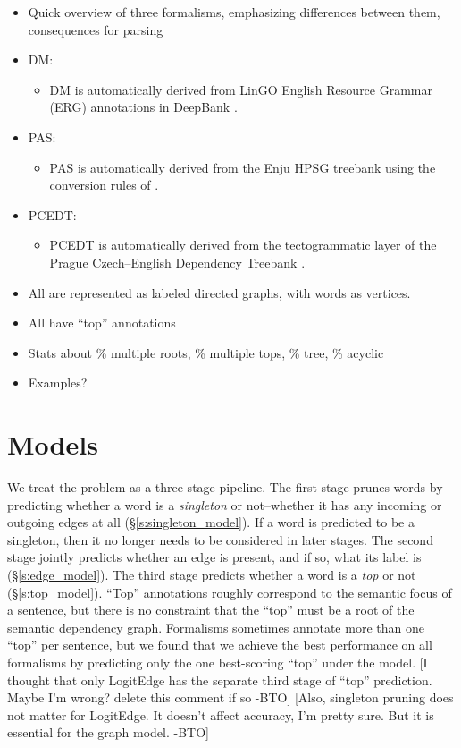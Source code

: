 \documentclass[11pt]{article}
\newcommand{\bocomment}[1]{\textcolor{Bittersweet}{[#1 -BTO]}}
\begin{document}
\begin{itemize}
	\item Quick overview of three formalisms, emphasizing differences between them, consequences for parsing
	\item DM:
	\begin{itemize}
	  \item DM is automatically derived from LinGO English Resource Grammar (ERG)
	  annotations in DeepBank \cite{flickinger_deepbank_2012}.
	\end{itemize}
	\item PAS:
	\begin{itemize}
	  \item PAS is automatically derived from the Enju HPSG treebank using the
	  conversion rules of .
	\end{itemize}
	\item PCEDT:
	\begin{itemize}
	  \item PCEDT is automatically derived from the tectogrammatic layer of
	  the Prague Czech--English Dependency Treebank \cite{hajic_building_1998}.
	\end{itemize}
	\item All are represented as labeled directed graphs, with words as vertices.
	\item All have ``top'' annotations 
	\item Stats about \% multiple roots, \% multiple tops, \% tree, \% acyclic
	\item Examples? 
\end{itemize}


\section{Models}

We treat the problem as a three-stage pipeline.
The first stage prunes words by predicting whether a word is a \emph{singleton}
or not--whether it has any incoming or outgoing edges at all (\S\ref{s:singleton_model}).
If a word is predicted to be a singleton, then it no longer needs to be
considered in later stages.
The second stage jointly predicts whether an edge is
present, and if so, what its label is (\S\ref{s:edge_model}).
The third stage predicts whether a word is a \emph{top} or not
(\S\ref{s:top_model}).
``Top'' annotations roughly correspond to the semantic focus of a
sentence, but there is no constraint that the ``top'' must be a root of the
semantic dependency graph.
Formalisms sometimes annotate more than one ``top'' per sentence, but we
found that we achieve the best performance on all formalisms by predicting only
the one best-scoring ``top'' under the model.
\bocomment{I thought that only LogitEdge has the separate third stage of ``top'' prediction. Maybe I'm wrong? delete this comment if so}
\bocomment{Also, singleton pruning does not matter for LogitEdge.  It doesn't affect accuracy, I'm pretty sure.  But it is essential for the graph model.}
\end{document}
